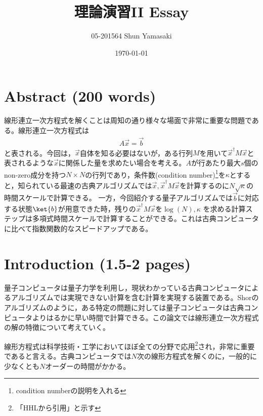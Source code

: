 \documentclass[b5paper,papersize,fleqn]{jsarticle}
\begin{document}
\title{理論演習II Essay}
\author{05-201564 Shun Yamasaki}
\date{\today}
\maketitle

\section{Abstract (200 words)}
線形連立一次方程式を解くことは周知の通り様々な場面で非常に重要な問題である。線形連立一次方程式は
\begin{eqnarray}
  A\vec{x} = \vec{b}
\end{eqnarray}
と表される。今回は，$\vec{x}$自体を知る必要はないが，ある行列$M$を用いて$\vec{x}^\dagger M \vec{x}$と表されるような$\vec{x}$に関係した量を求めたい場合を考える。$A$が行あたり最大$s$個のnon-zero成分を持つ$N\times N$の行列であり，条件数(condition number)\footnote{condition numberの説明を入れる}を$\kappa $とすると，知られている最速の古典アルゴリズムでは$\vec{x},\vec{x}^\dagger M \vec{x}$を計算するのに$N\sqrt{\kappa }$の時間スケールで計算できる。
一方，今回紹介する量子アルゴリズムでは$\vec{b}$に対応する状態$\ket{b}$が用意できた時，残りの$\vec{x}^\dagger M \vec{x}$を$\log(N),\kappa $ を求める計算ステップは多項式時間スケールで計算することができる。これは古典コンピュータに比べて指数関数的なスピードアップである。

\section{Introduction (1.5-2 pages)}

量子コンピュータは量子力学を利用し，現状わかっている古典コンピュータによるアルゴリズムでは実現できない計算を含む計算を実現する装置である。Shorのアルゴリズムのように，ある特定の問題に対しては量子コンピュータは古典コンピュータよりはるかに早い時間で計算できる。この論文では線形連立一次方程式の解の特徴について考えていく。


線形方程式は科学技術・工学においてほぼ全ての分野で応用\footnote{「HHLから引用」と示す}され，非常に重要であると言える。古典コンピュータでは$N$次の線形方程式を解くのに，一般的に少なくとも$N$オーダーの時間がかかる。
\end{document}
